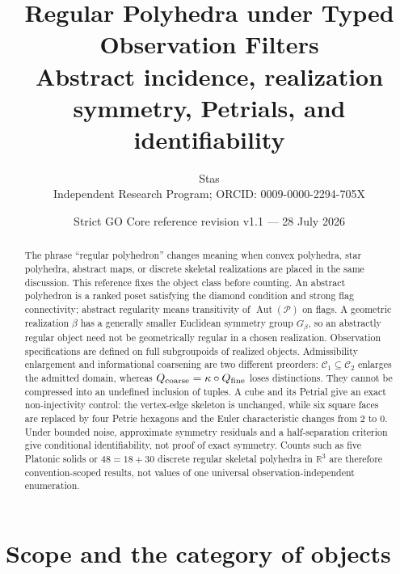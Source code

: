 \documentclass[11pt,a4paper]{article}
\title{\bfseries Regular Polyhedra under Typed Observation Filters\\
\large Abstract incidence, realization symmetry, Petrials, and identifiability}
\author{Stas\\
\small Independent Research Program; ORCID: 0009-0000-2294-705X}
\date{Strict GO Core reference revision v1.1 --- 28 July 2026}
\theoremstyle{definition}
\theoremstyle{plain}
\theoremstyle{remark}
\newcommand{\R}{\mathbb{R}}
\newcommand{\Aut}{\operatorname{Aut}}
\newcommand{\Ccal}{\mathcal C}
\newcommand{\Pcal}{\mathcal P}
\begin{document}
\maketitle

\begin{center}
\end{center}

\begin{abstract}
The phrase ``regular polyhedron'' changes meaning when convex
polyhedra, star polyhedra, abstract maps, or discrete skeletal
realizations are placed in the same discussion.  This reference fixes
the object class before counting.  An abstract polyhedron is a ranked
poset satisfying the diamond condition and strong flag connectivity;
abstract regularity means transitivity of \(\Aut(\Pcal)\) on flags.
A geometric realization \(\beta\) has a generally smaller Euclidean
symmetry group \(G_\beta\), so an abstractly regular object need not be
geometrically regular in a chosen realization.  Observation
specifications are defined on full subgroupoids of realized objects.
Admissibility enlargement and informational coarsening are two
different preorders: \(\Ccal_1\subseteq\Ccal_2\) enlarges the admitted
domain, whereas \(Q_{\rm coarse}=\kappa\circ Q_{\rm fine}\) loses
distinctions.  They cannot be compressed into an undefined inclusion
of tuples.  A cube and its Petrial give an exact non-injectivity
control: the vertex-edge skeleton is unchanged, while six square faces
are replaced by four Petrie hexagons and the Euler characteristic
changes from \(2\) to \(0\).  Under bounded noise, approximate
symmetry residuals and a half-separation criterion give conditional
identifiability, not proof of exact symmetry.  Counts such as five
Platonic solids or \(48=18+30\) discrete regular skeletal polyhedra in
\(\R^3\) are therefore convention-scoped results, not values of one
universal observation-independent enumeration.
\end{abstract}

\tableofcontents

\section{Scope and the category of objects}
\end{document}
